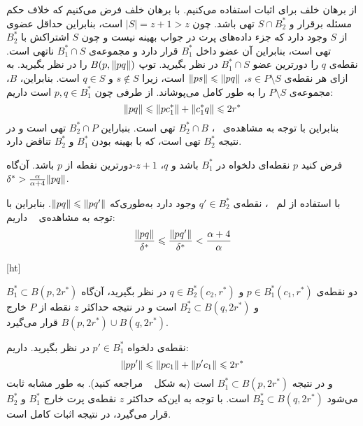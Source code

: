 از برهان خلف برای اثبات استفاده می‌کنیم. با برهان خلف فرض می‌کنیم که خلاف حکم مسئله برقرار و $S \cap B_2^*$ تهی باشد. چون $|S| = z+1 > z$ است، بنابراین حداقل عضوی از‌ $S$ وجود دارد که جزء داده‌های پرت در جواب بهینه نیست و چون $S$ اشتراکش با $B_2^*$ تهی است، بنابراین آن عضو داخل $B_1^*$ قرار دارد و مجموعه‌ی $B_1^* \cap S$ ناتهی است. نقطه‌ی $q$ را دورترین عضو $B_1^* \cap S$ در نظر بگیرید. توپ $B(p, \|{pq}\|)$ را در نظر بگیرید. به ازای هر نقطه‌ی $s \in P \setminus S$، $\|{ps}\| \leqslant \|{pq}\|$ است، زیرا $s \not \in S$ و $q \in S$ است. بنابراین، $B$، مجموعه‌ی $P \setminus S$ را به طور کامل می‌پوشاند. از طرفی چون $p, q \in B_1^*$ است داریم:
$$\|{pq}\| \leqslant \|{pc_1^*}\| + \|{c_1^* q}\| \leqslant 2r^*$$
بنابراین با توجه به مشاهده‌ی ~، $B_2^* \cap B$ تهی است. بنباراین $B_2^* \cap P$ تهی است و در نتیجه $B_2^*$ تهی است، که با بهینه بودن $B_1^*$ و $B_2^*$ تناقض دارد.


فرض کنید $p$ نقطه‌ای دلخواه در $B_1^*$ باشد و $q$، $z+1$-دورترین نقطه از $p$ باشد. آن‌گاه $\delta^* > \frac{\alpha}{\alpha + 4}\|{pq}\|$.


با استفاده از لم ~، نقطه‌ی $q' \in B_2^*$ وجود دارد به‌طوری‌که $\|{pq}\| \leqslant \|{pq'}\|$. بنابراین با توجه به مشاهده‌ی ~ داریم:
$$\frac{\|{pq}\|}{\delta^*} \leqslant \frac{\|{pq'}\|}{\delta^*} < \frac{\alpha + 4}{\alpha}$$



[ht]

دو نقطه‌ی $p \in B_1^*(c_1, r^*)$ و $q \in B_2^*(c_2, r^*)$ در نظر بگیرید، آن‌گاه‌ $B_1^* \subset B(p, 2r^*)$ و $B_2^* \subset B(q, 2r^*)$ است و در نتیجه حداکثر $z$ نقطه‌ از $P$ خارج $B(p, 2r^*) \cup B(q, 2r^*)$ قرار می‌گیرد.  

 
 نقطه‌ی دلخواه $p' \in B_1^*$ در نظر بگیرید. داریم:
 $$\|{pp'}\| \leqslant \|{pc_1}\| + \|{p'c_1}\| \leqslant 2r^*$$
 و در نتیجه $B_1^* \subset B(p, 2r^*)$ است (به شکل ~ مراجعه کنید). به طور مشابه ثابت می‌شود $B_2^* \subset B(q, 2r^*)$ است. با توجه به این‌که حداکثر $z$ نقطه‌ی پرت خارج $B_1^*$ و $B_2^*$ قرار می‌گیرد، در نتیجه اثبات کامل است.



